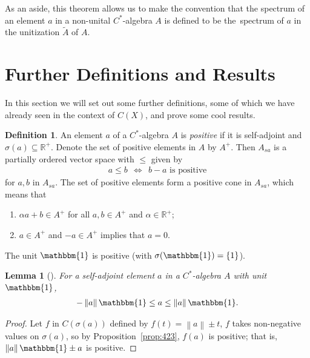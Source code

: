 \documentclass[11pt,a4paper]{report}
\theoremstyle{plain}
\newtheorem{lemma}{Lemma}
\theoremstyle{definition}
\newtheorem{defn}{Definition}
\newcommand{\1}{\mathbbm{1}}
\newcommand{\R}{\mathbb{R}}
\newcommand{\CX}{C(X)}
\newcommand{\spec}[1]{\sigma(#1)}
\begin{document}
As an aside, this theorem allows us to make the convention that the spectrum of 
an element $a$ in a non-unital $C^\ast$-algebra $A$ is defined to be 
the~spectrum of $a$ in the unitization $\tilde A$ of $A$.





\section{Further Definitions and Results}\label{section:further}
In this section we will set out some further definitions, some of which we have 
already seen in the context of $\CX$, and prove some cool results.


\begin{defn}
	An element $a$ of a $C^\ast$-algebra $A$ is \emph{positive} if it is 
	self-adjoint and $\spec a\subseteq \R^+$. Denote the set of positive elements 
	in $A$ by $A^+$. Then $A_{sa}$ is a partially ordered vector space with $\leq$ 
	given by
	\begin{align*}
		a\leq b ~~\iff~~ b-a \mbox{ is positive}
	\end{align*}
	for $a,b$ in $A_{sa}$.
	The set of positive elements form a positive cone in $A_{sa}$, which means that 
	\begin{enumerate}
		\item 	$\alpha a+b\in A^+$ for all $a,b \in A^+$ and $\alpha\in \R^+$;
		\item	$a\in A^+$ and $-a\in A^+$ implies that $a=0$.
	\end{enumerate}
\end{defn}

The unit $\1$ is positive (with $\spec \1 = \left\{1\right\}$). 

\begin{lemma}[{\cite[4.2.3(ii)]{kadison83}}]\label{lemma:423}
	For a self-adjoint element $a$ in a $C^\ast$-algebra $A$ with unit $\1$, 
	\begin{align*}
		-\left\|a\right\|\1 \leq a\leq\left\|a\right\|\1.
	\end{align*}
\end{lemma}
\begin{proof}
	Let $f$ in $C(\spec a)$ defined by $f(t) = \left\|a\right\| \pm t$, $f$ takes 
	non-negative values on $\spec a$, so by Proposition~\ref{prop:423}, $f(a)$ is 
	positive; that is, $\left\|a\right\|\1 \pm a$ is positive.

\end{proof}
	
\end{document}
